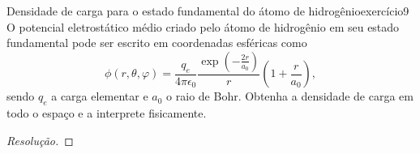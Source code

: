\begin{exercício}{Densidade de carga para o estado fundamental do átomo de hidrogênio}{exercício9}
    O potencial eletrostático médio criado pelo átomo de hidrogênio em seu estado fundamental pode ser escrito em coordenadas esféricas como
    \begin{equation*}
        \phi(r, \theta, \varphi) = \frac{q_e}{4\pi \epsilon_0} \frac{\exp\left(-\frac{2r}{a_0}\right)}{r} \left(1 + \frac{r}{a_0}\right),
    \end{equation*}
    sendo \(q_e\) a carga elementar e \(a_0\) o raio de Bohr. Obtenha a densidade de carga em todo o espaço e a interprete fisicamente.
\end{exercício}
\begin{proof}[Resolução]

\end{proof}
